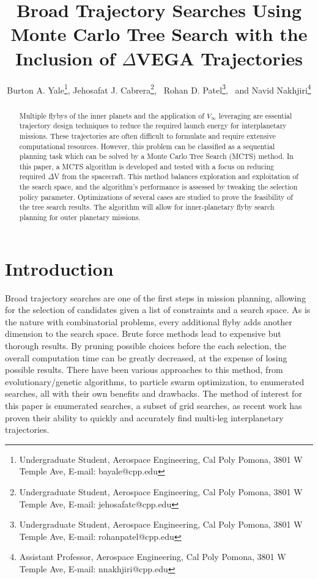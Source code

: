 \documentclass[letterpaper, preprint, paper,11pt]{AAS}	%
\begin{document}
\title{Broad Trajectory Searches Using Monte Carlo Tree Search with the Inclusion of $\Delta$VEGA Trajectories}

\author{Burton A. Yale\thanks{Undergraduate Student, Aerospace Engineering, Cal Poly Pomona, 3801 W Temple Ave, E-mail: bayale@cpp.edu},  
Jehosafat J. Cabrera\thanks{Undergraduate Student, Aerospace Engineering, Cal Poly Pomona, 3801 W Temple Ave, E-mail: jehosafatc@cpp.edu},
\ Rohan D. Patel\thanks{Undergraduate Student, Aerospace Engineering, Cal Poly Pomona, 3801 W Temple Ave, E-mail: rohanpatel@cpp.edu},
\ and Navid Nakhjiri\thanks{Assistant Professor, Aerospace Engineering, Cal Poly Pomona, 3801 W Temple Ave, E-mail: nnakhjiri@cpp.edu}
}


\maketitle{} 		


\begin{abstract}
Multiple flybys of the inner planets and the application of $V_{\infty}$ leveraging are essential trajectory design techniques to reduce the required launch energy for interplanetary missions. These trajectories are often difficult to formulate and require extensive computational resources. However, this problem can be classified as a sequential planning task which can be solved by a Monte Carlo Tree Search (MCTS) method. In this paper, a MCTS algorithm is developed and tested with a focus on reducing required $\Delta$V from the spacecraft. This method balances exploration and exploitation of the search space, and the algorithm’s performance is assessed by tweaking the selection policy parameter. Optimizations of several cases are studied to prove the feasibility of the tree search results. The algorithm will allow for inner-planetary flyby search planning for outer planetary missions.
\end{abstract}

\section{Introduction}
Broad trajectory searches are one of the first steps in mission planning, allowing for the selection of candidates given a list of constraints and a search space. As is the nature with combinatorial problems, every additional flyby adds another dimension to the search space. Brute force methods lead to expensive but thorough results. By pruning possible choices before the each selection, the overall computation time can be greatly decreased, at the expense of losing possible results. There have been various approaches to this method, from evolutionary/genetic algorithms, to particle swarm optimization, to enumerated searches, all with their own benefits and drawbacks. The method of interest for this paper is enumerated searches, a subset of grid searches, as recent work has proven their ability to quickly and accurately find multi-leg interplanetary trajectories\cite{Hennes2015}.
\end{document}

